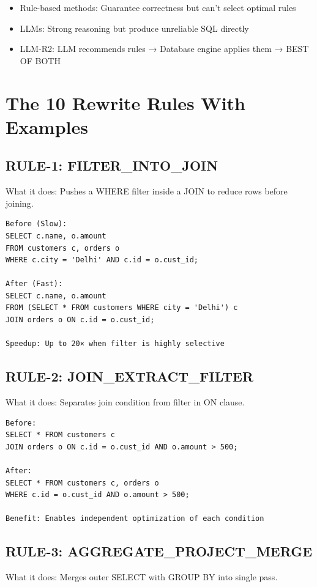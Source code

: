 \documentclass[12pt,a4paper]{article}
\begin{document}
\begin{itemize}
    \item Rule-based methods: Guarantee correctness but can't select optimal rules
    \item LLMs: Strong reasoning but produce unreliable SQL directly
    \item LLM-R2: LLM recommends rules → Database engine applies them → BEST OF BOTH
\end{itemize}



\section{The 10 Rewrite Rules With Examples}
\subsection{RULE-1: FILTER\_INTO\_JOIN }
What it does: Pushes a WHERE filter inside a JOIN to reduce rows before joining.

\begin{verbatim}
Before (Slow):
SELECT c.name, o.amount
FROM customers c, orders o
WHERE c.city = 'Delhi' AND c.id = o.cust_id;

After (Fast):
SELECT c.name, o.amount
FROM (SELECT * FROM customers WHERE city = 'Delhi') c
JOIN orders o ON c.id = o.cust_id;

Speedup: Up to 20× when filter is highly selective
\end{verbatim}

\subsection{RULE-2: JOIN\_EXTRACT\_FILTER}
What it does: Separates join condition from filter in ON clause.

\begin{verbatim}
Before:
SELECT * FROM customers c
JOIN orders o ON c.id = o.cust_id AND o.amount > 500;

After:
SELECT * FROM customers c, orders o
WHERE c.id = o.cust_id AND o.amount > 500;

Benefit: Enables independent optimization of each condition
\end{verbatim}

\subsection{RULE-3: AGGREGATE\_PROJECT\_MERGE}
What it does: Merges outer SELECT with GROUP BY into single pass.
\end{document}
